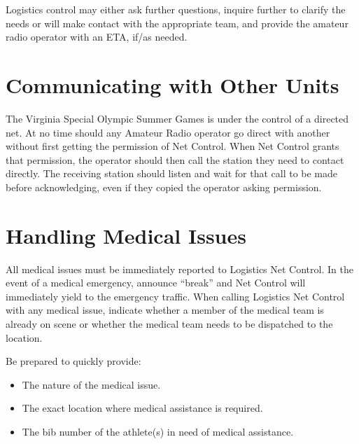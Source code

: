 \documentclass[pdflatex,letterpaper,twoside,12pt]{book}
\begin{document}
Logistics control may either ask further questions, inquire further to clarify the needs or will make contact with the appropriate team, and provide the amateur radio operator with an ETA, if/{}as needed.


\section{Communicating with Other Units}

The Virginia Special Olympic Summer Games is under the control of a directed net. At no time should any Amateur Radio operator go direct with another without first getting the permission of Net Control. When Net Control grants that permission, the operator should then call the station they need to contact directly. The receiving station should listen and wait for that call to be made before acknowledging, even if they copied the operator asking permission.


\section{Handling Medical Issues}

All medical issues must be immediately reported to Logistics Net Control.  In the event of a medical emergency, announce ``break'' and Net Control will immediately yield to the emergency traffic.  When calling Logistics Net Control with any medical issue, indicate whether a member of the medical team is already on scene or whether the medical team needs to be dispatched to the location.


Be prepared to quickly provide:

\begin{itemize}
	\item The nature of the medical issue.
	\item The exact location where medical assistance is required.
	\item The bib number of the athlete(s) in need of medical assistance.
\end{itemize}
\end{document}
